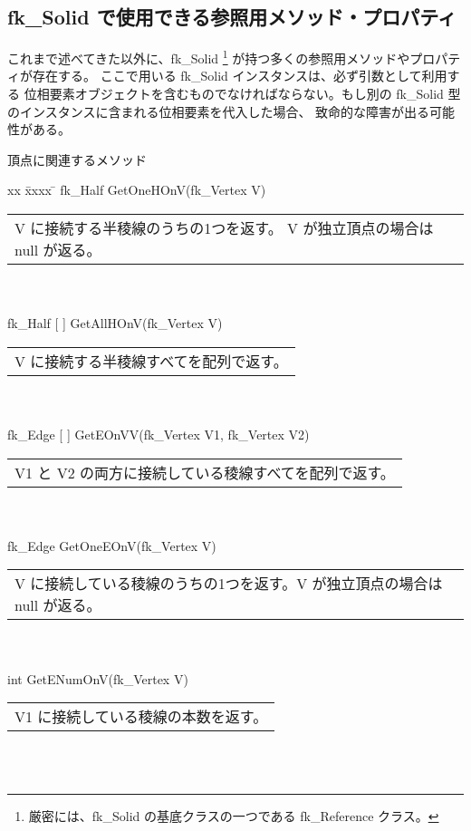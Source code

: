 \subsection{fk\_Solid で使用できる参照用メソッド・プロパティ}
これまで述べてきた以外に、fk\_Solid \footnote{厳密には、fk\_Solid の基底クラスの一つである
fk\_Reference クラス。} が持つ多くの参照用メソッドやプロパティが存在する。
ここで用いる fk\_Solid インスタンスは、必ず引数として利用する
位相要素オブジェクトを含むものでなければならない。もし別の
fk\_Solid 型のインスタンスに含まれる位相要素を代入した場合、
致命的な障害が出る可能性がある。
\begin{center}
{\large 頂点に関連するメソッド}
\end{center}
\begin{tabbing}
xx \= xxxx \= \kill
\> fk\_Half GetOneHOnV(fk\_Vertex V) \\
	\> \> \begin{tabular}{p{15cm}}
		V に接続する半稜線のうちの1つを返す。
		V が独立頂点の場合は null が返る。
	\end{tabular} \\ \\

\> fk\_Half [ ] GetAllHOnV(fk\_Vertex V) \\
	\> \> \begin{tabular}{p{15cm}}
		V に接続する半稜線すべてを配列で返す。
	\end{tabular} \\ \\

\> fk\_Edge [ ] GetEOnVV(fk\_Vertex V1, fk\_Vertex V2) \\
	\> \> \begin{tabular}{p{15cm}}
		V1 と V2 の両方に接続している稜線すべてを配列で返す。		
	\end{tabular} \\ \\

\> fk\_Edge GetOneEOnV(fk\_Vertex V) \\
	\> \> \begin{tabular}{p{15cm}}
		V に接続している稜線のうちの1つを返す。V が独立頂点の場合は null が返る。
	\end{tabular} \\ \\

\> int GetENumOnV(fk\_Vertex V) \\
	\> \> \begin{tabular}{p{15cm}}
		V1 に接続している稜線の本数を返す。
	\end{tabular} \\ \\


\end{tabbing}
